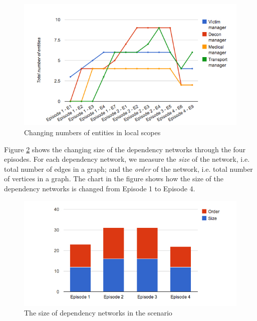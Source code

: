 \begin{figure}[htbp] %
	\centering
	\includegraphics[width=5.8in]{dynamics_of_local_scopes.jpg} 
	\caption{Changing numbers of entities in local scopes}
	\label{fig:dynamics_of_local_scopes}
\end{figure}

Figure \ref{fig:dynamics_of_dependencies} shows the changing size of the dependency networks through the four episodes. For each dependency network, we measure the \emph{size} of the network, i.e. total number of edges in a graph; and the \emph{order} of the network, i.e. total number of vertices in a graph. The chart in the figure shows how the size of the dependency networks is changed from Episode 1 to Episode 4.

\begin{figure}[htbp] %
	\centering
	\includegraphics[width=5.8in]{dynamics_of_dependencies.jpg} 
	\caption{The size of dependency networks in the scenario}
	\label{fig:dynamics_of_dependencies}
\end{figure}

